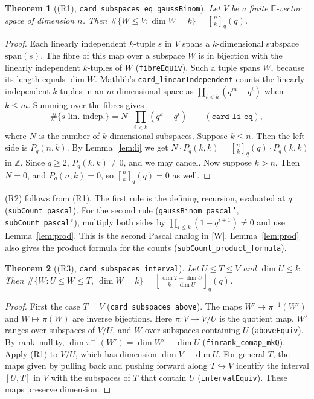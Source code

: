 \documentclass[11pt]{article}
\newtheorem{theorem}{Theorem}
\theoremstyle{definition}
\newcommand{\qb}[2]{\genfrac{[}{]}{0pt}{}{#1}{#2}_{q}}
\newcommand{\F}{\mathbb{F}}
\begin{document}
\begin{theorem}[(R1), \texttt{card\_subspaces\_eq\_gaussBinom}]
Let $V$ be a finite $\F$-vector space of dimension $n$. Then
$\#\{W\le V:\dim W=k\}=\qb{n}{k}(q)$.
\end{theorem}
\begin{proof}
Each linearly independent $k$-tuple $s$ in $V$ spans a $k$-dimensional subspace
$\mathrm{span}(s)$. The fibre of this map over a subspace $W$ is in bijection with the linearly
independent $k$-tuples of $W$ (\texttt{fibreEquiv}). Such a tuple spans $W$, because its length
equals $\dim W$. Mathlib's \texttt{card\_linearIndependent} counts the linearly independent
$k$-tuples in an $m$-dimensional space as $\prod_{i<k}(q^m-q^i)$ when $k\le m$. Summing over the
fibres gives
\[\#\{s\text{ lin.\ indep.}\}=N\cdot\prod_{i<k}(q^k-q^i)\qquad(\texttt{card\_li\_eq}),\]
where $N$ is the number of $k$-dimensional subspaces. Suppose $k\le n$. Then the left side is
$P_q(n,k)$. By Lemma~\ref{lem:li} we get $N\cdot P_q(k,k)=\qb{n}{k}(q)\cdot P_q(k,k)$ in
$\mathbb{Z}$. Since $q\ge2$, $P_q(k,k)\ne0$, and we may cancel. Now suppose $k>n$. Then $N=0$,
and $P_q(n,k)=0$, so $\qb{n}{k}(q)=0$ as well.
\end{proof}

(R2) follows from (R1). The first rule is the defining recursion, evaluated at $q$
(\texttt{subCount\_pascal}). For the second rule (\texttt{gaussBinom\_pascal'},
\texttt{subCount\_pascal'}), multiply both sides by $\prod_{i\le k}(1-q^{i+1})\ne0$ and use
Lemma~\ref{lem:prod}. This is the second Pascal analog in [W]. Lemma~\ref{lem:prod} also gives
the product formula for the counts (\texttt{subCount\_product\_formula}).

\begin{theorem}[(R3), \texttt{card\_subspaces\_interval}]
Let $U\le T\le V$ and $\dim U\le k$. Then
$\#\{W: U\le W\le T,\ \dim W=k\}=\qb{\dim T-\dim U}{k-\dim U}(q)$.
\end{theorem}
\begin{proof}
First the case $T=V$ (\texttt{card\_subspaces\_above}). The maps $W'\mapsto\pi^{-1}(W')$ and
$W\mapsto\pi(W)$ are inverse bijections. Here $\pi:V\to V/U$ is the quotient map, $W'$ ranges
over subspaces of $V/U$, and $W$ over subspaces containing $U$ (\texttt{aboveEquiv}). By
rank--nullity, $\dim\pi^{-1}(W')=\dim W'+\dim U$ (\texttt{finrank\_comap\_mkQ}). Apply (R1) to
$V/U$, which has dimension $\dim V-\dim U$. For general $T$, the maps given by pulling back and
pushing forward along $T\hookrightarrow V$ identify the interval $[U,T]$ in $V$ with the
subspaces of $T$ that contain $U$ (\texttt{intervalEquiv}). These maps preserve dimension.
\end{proof}
\end{document}
